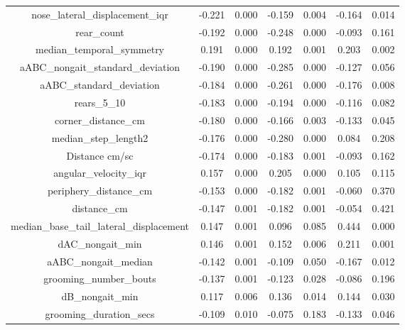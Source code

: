 \documentclass[11pt,reqno]{amsart}
\begin{document}
\begin{longtable}[c]{|c|c|c|c|c|c|c|}
nose\_lateral\_displacement\_iqr          & -0.221   & 0.000   & -0.159 & 0.004   & -0.164  & 0.014   \\
rear\_count                               & -0.192   & 0.000   & -0.248 & 0.000   & -0.093  & 0.161   \\
median\_temporal\_symmetry                & 0.191    & 0.000   & 0.192  & 0.001   & 0.203   & 0.002   \\
aABC\_nongait\_standard\_deviation        & -0.190   & 0.000   & -0.285 & 0.000   & -0.127  & 0.056   \\
aABC\_standard\_deviation                 & -0.184   & 0.000   & -0.261 & 0.000   & -0.176  & 0.008   \\
rears\_5\_10                              & -0.183   & 0.000   & -0.194 & 0.000   & -0.116  & 0.082   \\
corner\_distance\_cm                      & -0.180   & 0.000   & -0.166 & 0.003   & -0.133  & 0.045   \\
median\_step\_length2                     & -0.176   & 0.000   & -0.280 & 0.000   & 0.084   & 0.208   \\
Distance cm/sc                            & -0.174   & 0.000   & -0.183 & 0.001   & -0.093  & 0.162   \\
angular\_velocity\_iqr                    & 0.157    & 0.000   & 0.205  & 0.000   & 0.105   & 0.115   \\
periphery\_distance\_cm                   & -0.153   & 0.000   & -0.182 & 0.001   & -0.060  & 0.370   \\
distance\_cm                              & -0.147   & 0.001   & -0.182 & 0.001   & -0.054  & 0.421   \\
median\_base\_tail\_lateral\_displacement & 0.147    & 0.001   & 0.096  & 0.085   & 0.444   & 0.000   \\
dAC\_nongait\_min                         & 0.146    & 0.001   & 0.152  & 0.006   & 0.211   & 0.001   \\
aABC\_nongait\_median                     & -0.142   & 0.001   & -0.109 & 0.050   & -0.167  & 0.012   \\
grooming\_number\_bouts                   & -0.137   & 0.001   & -0.123 & 0.028   & -0.086  & 0.196   \\
dB\_nongait\_min                          & 0.117    & 0.006   & 0.136  & 0.014   & 0.144   & 0.030   \\
grooming\_duration\_secs                  & -0.109   & 0.010   & -0.075 & 0.183   & -0.133  & 0.046   \\

\end{longtable}
\end{document}
